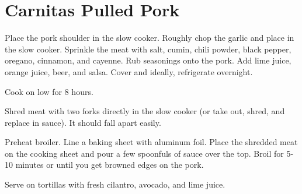 \section{Carnitas Pulled Pork}
\begin{recipe}



	Place the pork shoulder in the slow cooker. Roughly chop the garlic and place in the slow cooker. Sprinkle the meat with salt, cumin, chili powder, black pepper, oregano, cinnamon, and cayenne. Rub seasonings onto the pork. Add lime juice, orange juice, beer, and salsa. Cover and ideally, refrigerate overnight.

	Cook on low for 8 hours.

	Shred meat with two forks directly in the slow cooker (or take out, shred, and replace in sauce). It should fall apart easily.

	Preheat broiler. Line a baking sheet with aluminum foil. Place the shredded meat on the cooking sheet and pour a few spoonfuls of sauce over the top. Broil for 5-10 minutes or until you get browned edges on the pork.

	Serve on tortillas with fresh cilantro, avocado, and lime juice.

\end{recipe}
